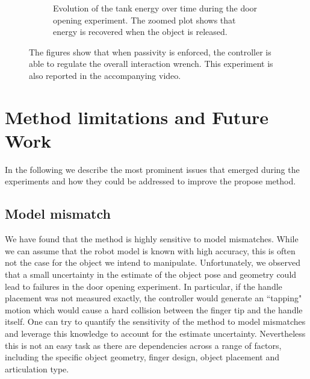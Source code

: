 \begin{figure}[t]
\begin{subfigure}{0.9\columnwidth}
    \caption{Evolution of the tank energy over time during the door opening experiment. The zoomed plot shows that energy is recovered when the object is released.}
\end{subfigure}
    \caption{The figures show that when passivity is enforced, the controller is able to regulate the overall interaction wrench. This experiment is also reported in the accompanying video.}
    \label{fig:passivity_experiment}
\end{figure}



\section{Method limitations and Future Work}\label{sec:limitations_and_future_works}
In the following we describe the most prominent issues that emerged during the experiments and how they could be addressed to improve the propose method.

\subsection{Model mismatch}
We have found that the method is highly sensitive to model mismatches. While we can assume that the robot model is known with high accuracy, this is often not the case for the object we intend to manipulate. Unfortunately, we observed that a small uncertainty in the estimate of the object pose and geometry could lead to failures in the door opening experiment. In particular, if the handle placement was not measured exactly, the controller would generate an ``tapping" motion which would cause a hard collision between the finger tip and the handle itself. One can try to quantify the sensitivity of the method to model mismatches and leverage this knowledge to account for the estimate uncertainty. Nevertheless this is not an easy task as there are dependencies across a range of factors, including the specific object geometry, finger design, object placement and articulation type. 

